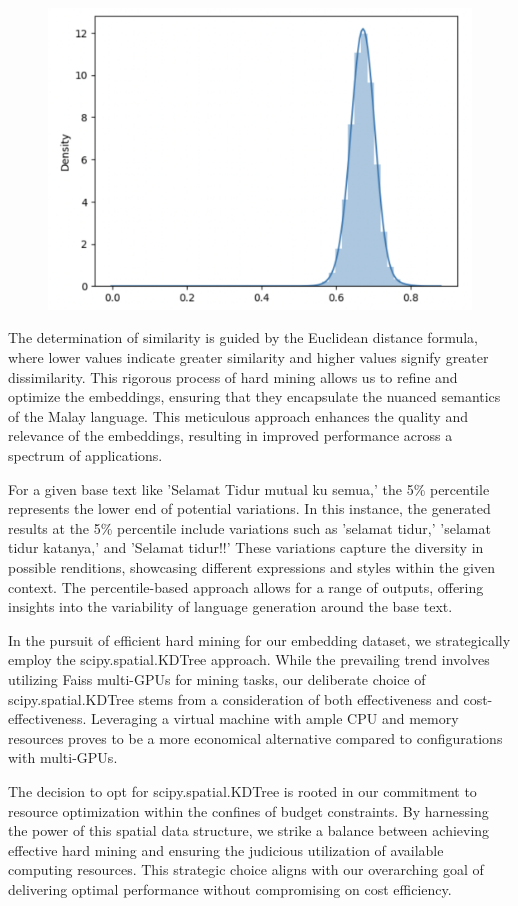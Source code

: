 \documentclass[preprint]{article}
\begin{document}
\begin{figure}[h]
  \centering
  \includegraphics[width=0.6\linewidth]{img/distribution.png}
\end{figure}

The determination of similarity is guided by the Euclidean distance formula, where lower values indicate greater similarity and higher values signify greater dissimilarity. This rigorous process of hard mining allows us to refine and optimize the embeddings, ensuring that they encapsulate the nuanced semantics of the Malay language. This meticulous approach enhances the quality and relevance of the embeddings, resulting in improved performance across a spectrum of applications.

For a given base text like 'Selamat Tidur mutual ku semua,' the 5\% percentile represents the lower end of potential variations. In this instance, the generated results at the 5\% percentile include variations such as 'selamat tidur,' 'selamat tidur katanya,' and 'Selamat tidur!!' These variations capture the diversity in possible renditions, showcasing different expressions and styles within the given context. The percentile-based approach allows for a range of outputs, offering insights into the variability of language generation around the base text.

\pagebreak

In the pursuit of efficient hard mining for our embedding dataset, we strategically employ the scipy.spatial.KDTree approach. While the prevailing trend involves utilizing Faiss multi-GPUs \cite{johnson2017billionscale} for mining tasks, our deliberate choice of scipy.spatial.KDTree stems from a consideration of both effectiveness and cost-effectiveness. Leveraging a virtual machine with ample CPU and memory resources proves to be a more economical alternative compared to configurations with multi-GPUs.

The decision to opt for scipy.spatial.KDTree is rooted in our commitment to resource optimization within the confines of budget constraints. By harnessing the power of this spatial data structure, we strike a balance between achieving effective hard mining and ensuring the judicious utilization of available computing resources. This strategic choice aligns with our overarching goal of delivering optimal performance without compromising on cost efficiency.
\end{document}
